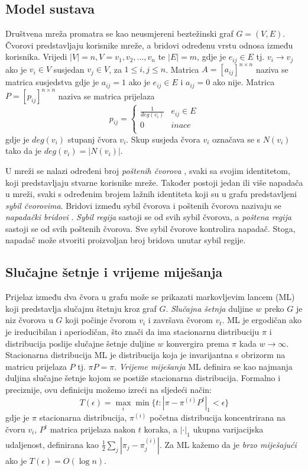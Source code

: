 \documentclass[times, utf8, seminar, numeric]{fer}
\begin{document}
\subsection{Model sustava}
Društvena mreža promatra se kao neusmjereni beztežinski graf $G = (V, E)$. Čvorovi predstavljaju korisnike mreže, a bridovi određenu vrstu odnosa između korisnika. Vrijedi $|V| = n, V = {v_1, v_2, ..., v_n}$ te $|E| = m$, gdje je $e_{ij} \in E$ tj. $v_i \to v_j$ ako je $v_i \in V$ susjedan $v_j \in V$, za $1 \leq i, j \leq n$. Matrica $A = [a_{ij}]^{n \times n}$ naziva se matrica susjedstva gdje je $a_{ij} = 1$ ako je $e_{ij} \in E$ i $a_{ij} = 0$ ako nije. Matrica $P = [p_{ij}]^{n \times n}$ naziva se matrica prijelaza 
\[ p_{ij} = 
  \begin{cases}
    \frac{1}{deg(v_i)} & e_{ij} \in E \\
    0 & inace \\
  \end{cases}
\]
gdje je $deg(v_i)$ stupanj čvora $v_i$. Skup susjeda čvora $v_i$ označava se s $N(v_i)$ tako da je $deg(v_i) = |N(v_i)|$.

U mreži se nalazi određeni broj \textit{poštenih čvorova} , svaki sa svojim identitetom, koji predstavljaju stvarne korisnike mreže. Također postoji jedan ili više napadača u mreži, svaki s određenim brojem lažnih identiteta koji su u grafu predstavljeni \textit{sybil čvorovima}. Bridovi između sybil čvorova i poštenih čvorova nazivaju se \textit{napadački bridovi} . \textit{Sybil regija}  sastoji se od svih sybil čvorova, a \textit{poštena regija}  sastoji se od svih poštenih čvorova. Sve sybil čvorove kontrolira napadač. Stoga, napadač može stvoriti proizvoljan broj bridova unutar sybil regije.

\subsection{Slučajne šetnje i vrijeme miješanja}
Prijelaz između dva čvora u grafu može se prikazati markovljevim lancem (ML) koji predstavlja slučajnu štetnju kroz graf $G$. \textit{Slučajna šetnja} duljine $w$ preko $G$ je niz čvorova u $G$ koji počinje čvorom $v_i$ i završava čvorom $v_t$. ML je ergodičan  ako je ireducibilan i aperiodičan, što znači da ima stacionarnu distribuciju $\pi$ i distribucija poslije slučajne šetnje duljine $w$ konvergira prema $\pi$ kada $w \to \infty$. Stacionarna distribucija ML je distribucija koja je invarijantna s obrizorm na matricu prijelaza $P$ tj. $\pi P = \pi$. \textit{Vrijeme miješanja}  ML definira se kao najmanja duljina slučajne šetnje kojom se postiže stacionarna distribucija. Formalno i preciznije, ovu definiciju možemo izreći na sljedeći način:
\[
  T(\epsilon) = \max_{i} \min \{t : |\pi - \pi^{(i)} P^t|_1 < \epsilon\}
\]
gdje je $\pi$ stacionarna distribucija, $\pi^{(i)}$ početna distribucija koncentrirana na čvoru $v_i$, $P^t$ matrica prijelaza nakon $t$ koraka, a $|\cdot|_1$ ukupna varijacijska udaljenost, definirana kao $\frac{1}{2} \sum_{j} |\pi_j - \pi_j^{(i)}|$. Za ML kažemo da je \textit{brzo miješajući}  ako je $T(\epsilon) = O(\log n)$. \cite{friends} 
\end{document}

